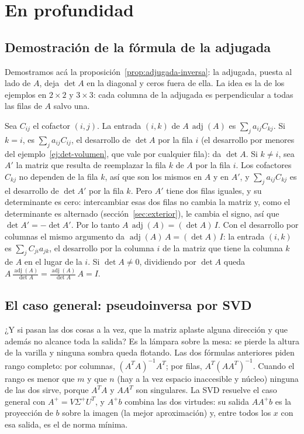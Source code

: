 \section{En profundidad}

\subsection{Demostración de la fórmula de la adjugada}\label{sec:inv-demostraciones}

Demostramos acá la proposición~\ref{prop:adjugada-inversa}: la adjugada, puesta al lado de
\(A\), deja \(\det A\) en la diagonal y ceros fuera de ella. La idea es la de los ejemplos en
\(2\times2\) y \(3\times3\): cada columna de la adjugada es perpendicular a todas las filas de
\(A\) salvo una.

\begin{demostracion}
Sea \(C_{ij}\) el cofactor \((i,j)\). La entrada \((i,k)\) de \(A\,\operatorname{adj}(A)\) es
\(\sum_j a_{ij}C_{kj}\). Si \(k=i\), es \(\sum_j a_{ij}C_{ij}\), el desarrollo de \(\det A\)
por la fila \(i\) (el desarrollo por menores del ejemplo~\ref{ej:det-volumen}, que vale por
cualquier fila): da \(\det A\). Si \(k\neq i\), sea \(A'\) la matriz que resulta de
reemplazar la fila \(k\) de \(A\) por la fila \(i\). Los cofactores \(C_{kj}\) no dependen
de la fila \(k\), así que son los mismos en \(A\) y en \(A'\), y \(\sum_j a_{ij}C_{kj}\) es el
desarrollo de \(\det A'\) por la fila \(k\). Pero \(A'\) tiene dos filas iguales, y su
determinante es cero: intercambiar esas dos filas no cambia la matriz y, como el
determinante es alternado (sección~\ref{sec:exterior}), le cambia el signo, así que
\(\det A'=-\det A'\). Por lo tanto \(A\,\operatorname{adj}(A)=(\det A)\,I\). Con el
desarrollo por columnas el mismo argumento da \(\operatorname{adj}(A)\,A=(\det A)\,I\): la
entrada \((i,k)\) es \(\sum_j C_{ji}a_{jk}\), el desarrollo por la columna \(i\) de la
matriz que tiene la columna \(k\) de \(A\) en el lugar de la \(i\). Si \(\det A\neq0\),
dividiendo por \(\det A\) queda \(A\,\tfrac{\operatorname{adj}(A)}{\det A}=
\tfrac{\operatorname{adj}(A)}{\det A}\,A=I\).
\end{demostracion}

\subsection{El caso general: pseudoinversa por SVD}\label{sec:pinv-svd}

¿Y si pasan las dos cosas a la vez, que la matriz aplaste alguna dirección y que además no
alcance toda la salida? Es la lámpara sobre la mesa: se pierde la altura de la varilla y
ninguna sombra queda flotando. Las dos fórmulas anteriores piden rango completo: por columnas, \((A^TA)^{-1}A^T\); por
filas, \(A^T(AA^T)^{-1}\). Cuando el rango es menor que \(m\) y que \(n\) (hay a la vez
espacio inaccesible y núcleo) ninguna de las dos sirve, porque \(A^TA\) y \(AA^T\) son
singulares. La SVD resuelve el caso general con \(A^{+}=V\Sigma^{+}U^T\), y \(A^{+}b\)
combina las dos virtudes: su salida
\(AA^{+}b\) es la proyección de \(b\) sobre la imagen (la mejor aproximación) y, entre todos
los \(x\) con esa salida, es el de norma mínima.

